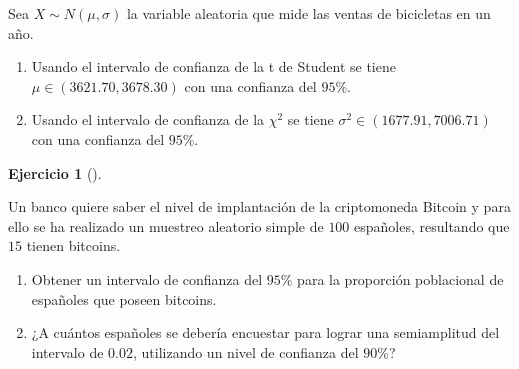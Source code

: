 \documentclass[
  spanish,
  a4paper,
]{scrreport}
\theoremstyle{definition}
\newtheorem{exercise}{Ejercicio}[chapter]
\theoremstyle{remark}
\begin{document}
\begin{tcolorbox}[enhanced jigsaw, arc=.35mm, bottomrule=.15mm, bottomtitle=1mm, breakable, colback=white, colbacktitle=quarto-callout-tip-color!10!white, colframe=quarto-callout-tip-color-frame, coltitle=black, left=2mm, leftrule=.75mm, opacityback=0, opacitybacktitle=0.6, rightrule=.15mm, title=\textcolor{quarto-callout-tip-color}{\faLightbulb}\hspace{0.5em}{Solución}, titlerule=0mm, toprule=.15mm, toptitle=1mm]

Sea \(X\sim N(\mu,\sigma)\) la variable aleatoria que mide las ventas de
bicicletas en un año.

\begin{enumerate}
\def\labelenumi{\alph{enumi}.}
\item
  Usando el intervalo de confianza de la t de Student se tiene
  \(\mu \in (3621.70, 3678.30)\) con una confianza del \(95\)\%.
\item
  Usando el intervalo de confianza de la \(\chi^2\) se tiene
  \(\sigma^2 \in (1677.91, 7006.71)\) con una confianza del \(95\)\%.
\end{enumerate}

\end{tcolorbox}

\begin{exercise}[]\protect\hypertarget{exr-intervalo-confianza-media-bitcoin}{}\label{exr-intervalo-confianza-media-bitcoin}

Un banco quiere saber el nivel de implantación de la criptomoneda
Bitcoin y para ello se ha realizado un muestreo aleatorio simple de
\(100\) españoles, resultando que \(15\) tienen bitcoins.

\begin{enumerate}
\def\labelenumi{\alph{enumi}.}
\item
  Obtener un intervalo de confianza del \(95\)\% para la proporción
  poblacional de españoles que poseen bitcoins.
\item
  ¿A cuántos españoles se debería encuestar para lograr una semiamplitud
  del intervalo de \(0.02\), utilizando un nivel de confianza del
  \(90\)\%?
\end{enumerate}

\end{exercise}
\end{document}

